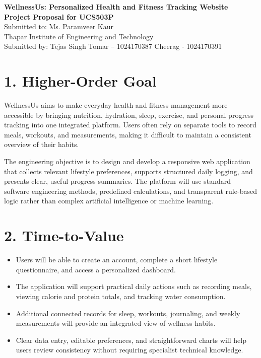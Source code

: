 \documentclass[11pt,a4paper]{article}
\begin{document}
\begin{center}
{\bfseries\large WellnessUs: Personalized Health and Fitness Tracking Website}\\[5pt]
{\bfseries Project Proposal for UCS503P}\\[12pt]
Submitted to: Ms. Paramveer Kaur\\[5pt]
Thapar Institute of Engineering and Technology\\[14pt]
Submitted by: Tejas Singh Tomar -- 1024170387 \qquad Cheerag - 1024170391
\end{center}
\vspace{9pt}
\section*{1. Higher-Order Goal}
WellnessUs aims to make everyday health and fitness management more accessible by bringing nutrition, hydration, sleep, exercise, and personal progress tracking into one integrated platform. Users often rely on separate tools to record meals, workouts, and measurements, making it difficult to maintain a consistent overview of their habits.

The engineering objective is to design and develop a responsive web application that collects relevant lifestyle preferences, supports structured daily logging, and presents clear, useful progress summaries. The platform will use standard software engineering methods, predefined calculations, and transparent rule-based logic rather than complex artificial intelligence or machine learning.

\section*{2. Time-to-Value}
\begin{itemize}
\item Users will be able to create an account, complete a short lifestyle questionnaire, and access a personalized dashboard.
\item The application will support practical daily actions such as recording meals, viewing calorie and protein totals, and tracking water consumption.
\item Additional connected records for sleep, workouts, journaling, and weekly measurements will provide an integrated view of wellness habits.
\item Clear data entry, editable preferences, and straightforward charts will help users review consistency without requiring specialist technical knowledge.
\end{itemize}
\end{document}

